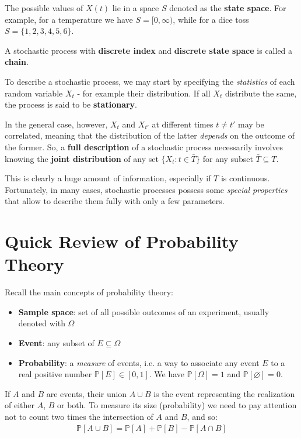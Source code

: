 \documentclass[../template.tex]{subfiles}
\begin{document}
\medskip

The possible values of $X(t)$ lie in a space $S$ denoted as the \textbf{state space}. For example, for a temperature we have $S=[0,\infty)$, while for a dice toss $S=\{1,2,3,4,5,6\}$.

\medskip

A stochastic process with \textbf{discrete index} and \textbf{discrete state space} is called a \textbf{chain}.

\medskip

To describe a stochastic process, we may start by specifying the \textit{statistics} of each random variable $X_t$ - for example their distribution. If all $X_t$ distribute the same, the process is said to be \textbf{stationary}. 

In the general case, however, $X_t$ and $X_{t'}$ at different times $t\neq t'$ may be correlated, meaning that the distribution of the latter \textit{depends} on the outcome of the former. So, a \textbf{full description} of a stochastic process necessarily involves knowing the \textbf{joint distribution} of any set $\{X_t \colon t \in \bar{T}\}$ for any subset $\bar{T} \subseteq T$. 

This is clearly a huge amount of information, especially if $T$ is continuous. Fortunately, in many cases, stochastic processes possess some \textit{special properties} that allow to describe them fully with only a few parameters. 

\section{Quick Review of Probability Theory}
Recall the main concepts of probability theory:
\begin{itemize}
    \item \textbf{Sample space}: set of all possible outcomes of an experiment, usually denoted with $\Omega$
    \item \textbf{Event}: any subset of $E \subseteq \Omega$
    \item \textbf{Probability}: a \textit{measure} of events, i.e. a way to associate any event $E$ to a real positive number $\mathbb{P}[E] \in [0,1]$. We have $\mathbb{P}[\Omega] = 1$ and $\mathbb{P}[\varnothing] = 0$.   
\end{itemize}
If $A$ and $B$ are events, their union $A \cup B$ is the event representing the realization of either $A$, $B$ or both. To measure its size (probability) we need to pay attention not to count two times the intersection of $A$ and $B$, and so:
\begin{align*}
    \mathbb{P}[A \cup B] = \mathbb{P}[A] + \mathbb{P}[B] - \mathbb{P}[A \cap B]
\end{align*}
\end{document}
